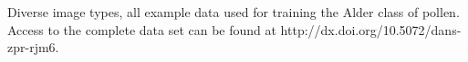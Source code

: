 \label{fig:trainingImages}
Diverse image types, all example data used for training the Alder class of pollen. Access to the complete data set can be found at http://dx.doi.org/10.5072/dans-zpr-rjm6.
  
  